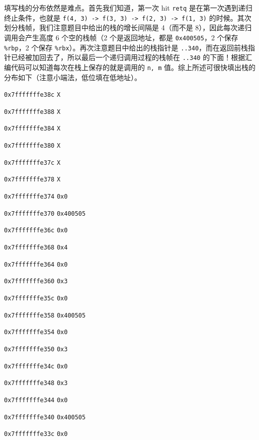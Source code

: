 \begin{problems}
        填写栈的分布依然是难点。首先我们知道，第一次 hit \verb|retq| 是在第一次遇到递归终止条件，也就是 \verb|f(4, 3) -> f(3, 3) -> f(2, 3) -> f(1, 3)| 的时候。其次划分栈帧，我们注意题目中给出的栈的增长间隔是 4（而不是 8），因此每次递归调用会产生高度 6 个空的栈帧（2 个是返回地址，都是 \verb|0x400505|，2 个保存 \verb|%rbp|，2 个保存 \verb|%rbx|）。再次注意题目中给出的栈指针是 \verb|..340|，而在返回前栈指针已经被加回去了，所以最后一个递归调用过程的栈帧在 \verb|..340| 的下面！根据汇编代码可以知道每次在栈上保存的就是调用的 \verb|n, m| 值。综上所述可很快填出栈的分布如下（注意小端法，低位填在低地址）。
        \begin{compactdesc}
            \item[\texttt{0x7fffffffe38c}] \verb|X|
            \item[\texttt{0x7fffffffe388}] \verb|X|
            \item[\texttt{0x7fffffffe384}] \verb|X|
            \item[\texttt{0x7fffffffe380}] \verb|X|
            \item[\texttt{0x7fffffffe37c}] \verb|X|
            \item[\texttt{0x7fffffffe378}] \verb|X|
            \item[\texttt{0x7fffffffe374}] \verb|0x0|
            \item[\texttt{0x7fffffffe370}] \verb|0x400505|
            \item[\texttt{0x7fffffffe36c}] \verb|0x0|
            \item[\texttt{0x7fffffffe368}] \verb|0x4|
            \item[\texttt{0x7fffffffe364}] \verb|0x0|
            \item[\texttt{0x7fffffffe360}] \verb|0x3|
            \item[\texttt{0x7fffffffe35c}] \verb|0x0|
            \item[\texttt{0x7fffffffe358}] \verb|0x400505|
            \item[\texttt{0x7fffffffe354}] \verb|0x0|
            \item[\texttt{0x7fffffffe350}] \verb|0x3|
            \item[\texttt{0x7fffffffe34c}] \verb|0x0|
            \item[\texttt{0x7fffffffe348}] \verb|0x3|
            \item[\texttt{0x7fffffffe344}] \verb|0x0|
            \item[\texttt{0x7fffffffe340}] \verb|0x400505|
            \item[\texttt{0x7fffffffe33c}] \verb|0x0|

\end{compactdesc}
\end{problems}
